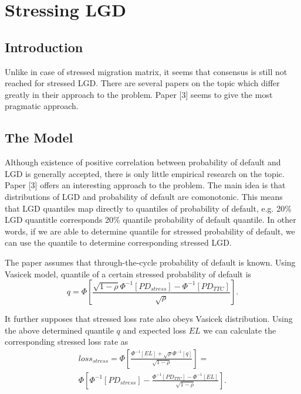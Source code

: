 \documentclass[a4paper]{article}
\begin{document}
\section{Stressing LGD}

\subsection{Introduction}

Unlike in case of stressed migration matrix, it seems that consensus is
still not reached for stressed LGD. There are several papers 
on the topic which differ greatly in their approach to the problem. 
Paper [3] seems to give the most pragmatic approach.

\subsection{The Model}

Although existence of positive correlation between probability of default and LGD is 
generally accepted, there is only little empirical research on the 
topic. Paper [3] offers an interesting approach to the problem. The 
main idea is that distributions of LGD and probability of default are comonotonic. 
This means that LGD quantiles map directly to quantiles of probability of default, 
e.g. 20\% LGD quantitle corresponds 20\% quantile probability of default 
quantile. In other words, if we are able to determine quantile for 
stressed probability of default, we can use the quantile to determine 
corresponding stressed LGD.

The paper assumes that through-the-cycle probability of default is known. Using Vasicek model, quantile 
of a certain stressed probability of default is
\begin{equation}
q = \Phi \left[\frac{\sqrt{1 - \rho} \Phi^{-1}[PD_{stress}] - 
\Phi^{-1}[PD_{TTC}]}{\sqrt{\rho}}\right].
\end{equation}

It further supposes that stressed loss rate also obeys Vasicek distribution. 
Using the above determined quantile $q$ and expected loss $EL$ we can calculate the 
corresponding stressed loss rate as
\begin{multline}
loss_{stress} = \Phi \left[\frac{\Phi^{-1}[EL] + 
\sqrt{\rho}\Phi^{-1}[q]}{\sqrt{1 - \rho}} \right] = \\
\Phi\left[\Phi^{-1}[PD_{stress}] - \frac{\Phi^{-1}[PD_{TTC}] - 
\Phi^{-1}[EL]}{\sqrt{1 - \rho}}\right].
\end{multline}
\end{document}
